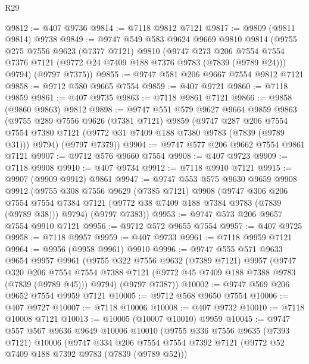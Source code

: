 \begin{lexlean}{R29}
\begin{coremodule}
@9812 := @407 @9736
@9814 := @7118 @9812 @7121
@9817 := @9809 (@9811 @9814) @9738
@9849 := @9747
    @549
    @583
    @9624
    @9669
    @9810
    @9814
    (@9755
      @275
      @7556
      @9623
      (@7377 @7121)
      @9810
      (@9747
        @273
        @206
        @7554
        @7554
        @7376
        @7121
        (@9772 @24 @7409 @188 @7376 @9783 (@7839 (@9789 @24)))
        @9794)
      (@9797 @7375))
@9855 := @9747 @581 @206 @9667 @7554 @9812 @7121
@9858 := @9712 @580 @9665 @7554
@9859 := @407 @9721
@9860 := @7118 @9859
@9861 := @407 @9735
@9863 := @7118 @9861 @7121
@9866 := @9858 (@9860 @9863) @9812
@9898 := @9747
    @551
    @579
    @9627
    @9664
    @9859
    @9863
    (@9755
      @289
      @7556
      @9626
      (@7381 @7121)
      @9859
      (@9747
        @287
        @206
        @7554
        @7554
        @7380
        @7121
        (@9772 @31 @7409 @188 @7380 @9783 (@7839 (@9789 @31)))
        @9794)
      (@9797 @7379))
@9904 := @9747 @577 @206 @9662 @7554 @9861 @7121
@9907 := @9712 @576 @9660 @7554
@9908 := @407 @9723
@9909 := @7118 @9908
@9910 := @407 @9734
@9912 := @7118 @9910 @7121
@9915 := @9907 (@9909 @9912) @9861
@9947 := @9747
    @553
    @575
    @9630
    @9659
    @9908
    @9912
    (@9755
      @308
      @7556
      @9629
      (@7385 @7121)
      @9908
      (@9747
        @306
        @206
        @7554
        @7554
        @7384
        @7121
        (@9772 @38 @7409 @188 @7384 @9783 (@7839 (@9789 @38)))
        @9794)
      (@9797 @7383))
@9953 := @9747 @573 @206 @9657 @7554 @9910 @7121
@9956 := @9712 @572 @9655 @7554
@9957 := @407 @9725
@9958 := @7118 @9957
@9959 := @407 @9733
@9961 := @7118 @9959 @7121
@9964 := @9956 (@9958 @9961) @9910
@9996 := @9747
    @555
    @571
    @9633
    @9654
    @9957
    @9961
    (@9755
      @322
      @7556
      @9632
      (@7389 @7121)
      @9957
      (@9747
        @320
        @206
        @7554
        @7554
        @7388
        @7121
        (@9772 @45 @7409 @188 @7388 @9783 (@7839 (@9789 @45)))
        @9794)
      (@9797 @7387))
@10002 := @9747 @569 @206 @9652 @7554 @9959 @7121
@10005 := @9712 @568 @9650 @7554
@10006 := @407 @9727
@10007 := @7118 @10006
@10008 := @407 @9732
@10010 := @7118 @10008 @7121
@10013 := @10005 (@10007 @10010) @9959
@10045 := @9747
    @557
    @567
    @9636
    @9649
    @10006
    @10010
    (@9755
      @336
      @7556
      @9635
      (@7393 @7121)
      @10006
      (@9747
        @334
        @206
        @7554
        @7554
        @7392
        @7121
        (@9772 @52 @7409 @188 @7392 @9783 (@7839 (@9789 @52)))

\end{coremodule}
\end{lexlean}
